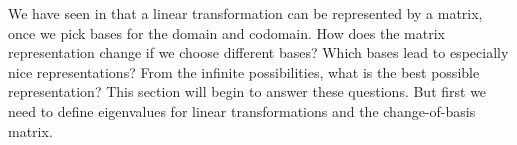 %
\begin{introduction}
\begin{para}We have seen in  that a linear transformation can be represented by a matrix, once we pick bases for the domain and codomain.  How does the matrix representation change if we choose different bases?  Which bases lead to especially nice representations?  From the infinite possibilities, what is the best possible representation?  This section will begin to answer these questions.  But first we need to define eigenvalues for linear transformations and the change-of-basis matrix.\end{para}
\end{introduction}
%
